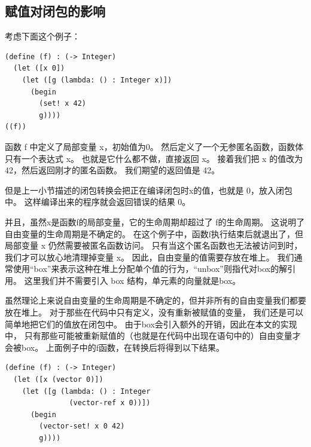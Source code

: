 \subsection{赋值对闭包的影响}

考虑下面这个例子：

\begin{multilinecode}
\begin{lstlisting}
(define (f) : (-> Integer)
  (let ([x 0])
    (let ([g (lambda: () : Integer x)])
      (begin
        (set! x 42)
        g))))
((f))
\end{lstlisting}
\end{multilinecode}


函数 f 中定义了局部变量 x，初始值为0。
然后定义了一个无参匿名函数，函数体只有一个表达式 x。
也就是它什么都不做，直接返回 x。
接着我们把 x 的值改为 42，然后返回刚才的匿名函数。
我们期望的返回值是 42。

但是上一小节描述的闭包转换会把正在编译闭包时x的值，也就是 0，放入闭包中。
这样编译出来的程序就会返回错误的结果 0。

并且，虽然x是函数f的局部变量，它的生命周期却超过了 f的生命周期。
这说明了自由变量的生命周期是不确定的。
在这个例子中，函数f执行结束后就退出了，但局部变量 x 仍然需要被匿名函数访问。
只有当这个匿名函数也无法被访问到时，我们才可以放心地清理掉变量 x。
因此，自由变量的值需要存放在堆上。
我们通常使用“box”来表示这种在堆上分配单个值的行为，“unbox”则指代对box的解引用。
这里我们并不需要引入 box 结构，单元素的向量就是box。

虽然理论上来说自由变量的生命周期是不确定的，但并非所有的自由变量我们都要放在堆上。
对于那些在代码中只有定义，没有重新被赋值的变量，
我们还是可以简单地把它们的值放在闭包中。
由于box会引入额外的开销，因此在本文的实现中，
只有那些可能被重新赋值的（也就是在代码中出现在语句中的）自由变量才会被box。
上面例子中的f函数，在转换后将得到以下结果。

\begin{multilinecode}
\begin{lstlisting}
(define (f) : (-> Integer)
  (let ([x (vector 0)])
    (let ([g (lambda: () : Integer
               (vector-ref x 0))])
      (begin
        (vector-set! x 0 42)
        g))))
\end{lstlisting}
\end{multilinecode}
